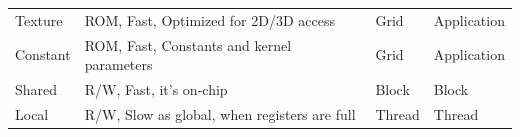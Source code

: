 \documentclass[
  12pt,
  a4paperpaper,
]{report}
\begin{document}
\begin{longtable}[]{@{}llll@{}}
\begin{minipage}[t]{0.13\columnwidth}
Texture\strut
\end{minipage} & \begin{minipage}[t]{0.53\columnwidth}\raggedright
ROM, Fast, Optimized for 2D/3D access\strut
\end{minipage} & \begin{minipage}[t]{0.09\columnwidth}\raggedright
Grid\strut
\end{minipage} & \begin{minipage}[t]{0.13\columnwidth}\raggedright
Application\strut
\end{minipage}\tabularnewline
\begin{minipage}[t]{0.13\columnwidth}\raggedright
Constant\strut
\end{minipage} & \begin{minipage}[t]{0.53\columnwidth}\raggedright
ROM, Fast, Constants and kernel parameters\strut
\end{minipage} & \begin{minipage}[t]{0.09\columnwidth}\raggedright
Grid\strut
\end{minipage} & \begin{minipage}[t]{0.13\columnwidth}\raggedright
Application\strut
\end{minipage}\tabularnewline
\begin{minipage}[t]{0.13\columnwidth}\raggedright
Shared\strut
\end{minipage} & \begin{minipage}[t]{0.53\columnwidth}\raggedright
R/W, Fast, it's on-chip\strut
\end{minipage} & \begin{minipage}[t]{0.09\columnwidth}\raggedright
Block\strut
\end{minipage} & \begin{minipage}[t]{0.13\columnwidth}\raggedright
Block\strut
\end{minipage}\tabularnewline
\begin{minipage}[t]{0.13\columnwidth}\raggedright
Local\strut
\end{minipage} & \begin{minipage}[t]{0.53\columnwidth}\raggedright
R/W, Slow as global, when registers are full\strut
\end{minipage} & \begin{minipage}[t]{0.09\columnwidth}\raggedright
Thread\strut
\end{minipage} & \begin{minipage}[t]{0.13\columnwidth}\raggedright
Thread\strut
\end{minipage}\tabularnewline

\end{longtable}
\end{document}
